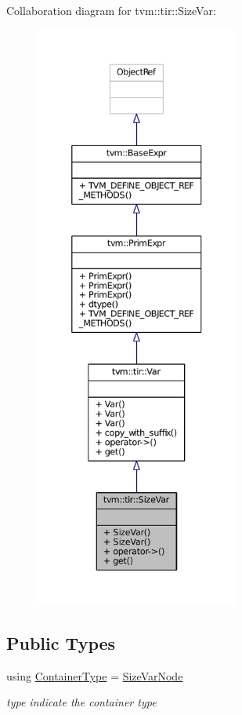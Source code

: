 Collaboration diagram for tvm\+:\+:tir\+:\+:Size\+Var\+:
\nopagebreak
\begin{figure}[H]
\begin{center}
\leavevmode
\includegraphics[height=550pt]{classtvm_1_1tir_1_1SizeVar__coll__graph}
\end{center}
\end{figure}
\subsection*{Public Types}
\begin{DoxyCompactItemize}
\item 
using \hyperlink{classtvm_1_1tir_1_1SizeVar_a3782dc98fd7c52a22a022ae25d5159a0}{Container\+Type} = \hyperlink{classtvm_1_1tir_1_1SizeVarNode}{Size\+Var\+Node}
\begin{DoxyCompactList}\small\item\em type indicate the container type \end{DoxyCompactList}\end{DoxyCompactItemize}
